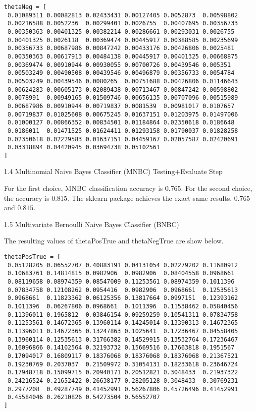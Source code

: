 \documentclass[11pt]{article}
\begin{document}
\begin{enumerate}
\begin{verbatim}
thetaNeg = [
 0.01089311 0.00082813 0.02433431 0.00127405 0.0052873  0.00598802
 0.00216588 0.0052236  0.00299401 0.0026755  0.00407695 0.00356733
 0.00350363 0.00401325 0.00382214 0.00286661 0.00293031 0.0026755
 0.00401325 0.0026118  0.00369474 0.00445917 0.00388585 0.00235699
 0.00356733 0.00687986 0.00847242 0.00433176 0.00426806 0.0025481
 0.00350363 0.00617913 0.00484138 0.00445917 0.00401325 0.00668875
 0.00369474 0.00910944 0.00930055 0.00700726 0.00439546 0.005351
 0.00503249 0.00490508 0.00439546 0.00496879 0.00356733 0.0054784
 0.00503249 0.00439546 0.0080265  0.00751688 0.00426806 0.01146643
 0.00624283 0.00605173 0.02089438 0.00713467 0.00847242 0.00598802
 0.0078991  0.00949165 0.01509746 0.00656135 0.00707096 0.00515989
 0.00687986 0.00910944 0.00719837 0.0081539  0.00981017 0.0107657
 0.00719837 0.01025608 0.00675245 0.01637151 0.01203975 0.01497006
 0.01000127 0.00866352 0.00834501 0.01184864 0.02350618 0.0186648
 0.0186011  0.01471525 0.01624411 0.01293158 0.01790037 0.01828258
 0.02350618 0.02229583 0.01637151 0.04459167 0.02057587 0.02420691
 0.03318894 0.04420945 0.03694738 0.05102561
]
\end{verbatim}

1.4 Multinomial Naive Bayes Classifier (MNBC) Testing+Evaluate Step

\medskip

For the first choice, MNBC classification accuracy is $0.765$. For the second choice, the accuracy is $0.815$. The sklearn package achieves the exact same results, $0.765$ and $0.815$.

\medskip

1.5 Multivariate Bernoulli Naive Bayes Classifier (BNBC)

\medskip

The resulting values of thetaPosTrue and thetaNegTrue are show below.

\begin{verbatim}
thetaPosTrue = [
 0.05128205 0.06552707 0.40883191 0.04131054 0.02279202 0.11680912
 0.10683761 0.14814815 0.0982906  0.0982906  0.08404558 0.0968661
 0.08119658 0.08974359 0.08547009 0.11253561 0.08974359 0.1011396
 0.07834758 0.12108262 0.0954416  0.0982906  0.0968661  0.12535613
 0.0968661  0.11823362 0.06125356 0.13817664 0.0997151  0.12393162
 0.1011396  0.06267806 0.0968661  0.1011396  0.11538462 0.05840456
 0.11396011 0.1965812  0.03846154 0.09259259 0.10541311 0.07834758
 0.11253561 0.14672365 0.13960114 0.14245014 0.13390313 0.14672365
 0.11396011 0.14672365 0.13247863 0.1025641  0.17236467 0.04558405
 0.13960114 0.12535613 0.31766382 0.14529915 0.13532764 0.17236467
 0.16096866 0.14102564 0.32193732 0.15669516 0.17663818 0.1951567
 0.17094017 0.16809117 0.18376068 0.18376068 0.18376068 0.21367521
 0.19230769 0.2037037  0.21509972 0.31054131 0.18233618 0.23646724
 0.17948718 0.15099715 0.20940171 0.20512821 0.3048433  0.21937322
 0.24216524 0.21652422 0.26638177 0.28205128 0.3048433  0.30769231
 0.2977208  0.49287749 0.41452991 0.56267806 0.45726496 0.41452991
 0.45584046 0.26210826 0.54273504 0.56552707
]
\end{verbatim}


\end{enumerate}
\end{document}

